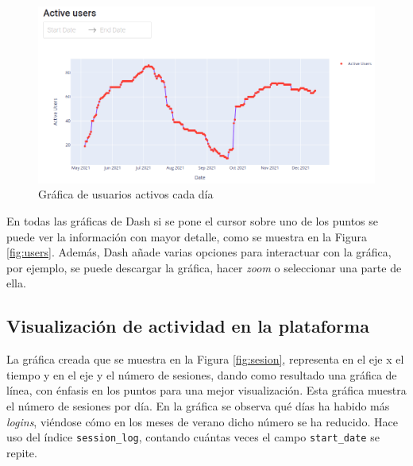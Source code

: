 \begin{figure}[H]
    \centering
    \includegraphics[width=15cm, keepaspectratio]{img/active.png}
    \caption{Gráfica de usuarios activos cada día}
    \label{fig:active}
\end{figure}

En todas las gráficas de Dash si se pone el cursor sobre uno de los puntos se puede ver la información con mayor detalle, como se muestra en la Figura \ref{fig:users}. Además, Dash añade varias opciones para interactuar con la gráfica, por ejemplo, se puede descargar la gráfica, hacer \textit{zoom} o seleccionar una parte de ella. \\
\subsection{Visualización de actividad en la plataforma}

La gráfica creada que se muestra en la Figura \ref{fig:sesion}, representa en el eje x el tiempo y en el eje y el número de sesiones, dando como resultado una gráfica de línea, con énfasis en los puntos para una mejor visualización. Esta gráfica muestra el número de sesiones por día. En la gráfica se observa qué días ha habido más \textit{logins}, viéndose cómo en los meses de verano dicho número se ha reducido. Hace uso del índice \texttt{session\_log}, contando cuántas veces el campo \texttt{start\_date} se repite.\\



